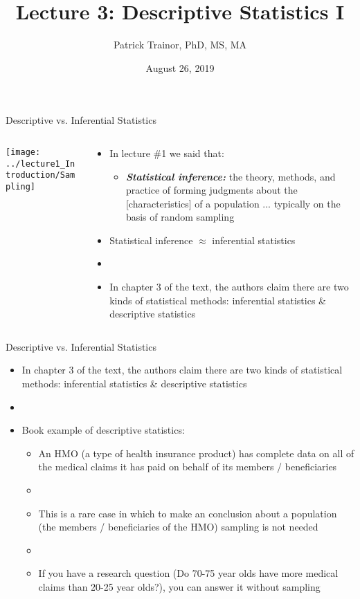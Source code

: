 \documentclass[xcolor=dvipsnames]{beamer}
\title[Lecture 1]{Lecture 3: Descriptive Statistics I}
\author[Patrick Trainor]{Patrick Trainor, PhD, MS, MA}
\institute[NMSU]{New Mexico State University}
\date{August 26, 2019}
\begin{document}
	
\begin{frame}
	\maketitle
\end{frame}

\begin{frame}{Descriptive vs. Inferential Statistics}
\begin{columns}
	\begin{column}{0.5 \textwidth}
		\texttt{[image: ../lecture1\_Introduction/Sampling]}
	\end{column}
	\begin{column}{0.5 \textwidth}
		\begin{itemize}
		\item In lecture \#1 we said that:
		\begin{itemize}
			\item \textbf{\emph{Statistical inference:}} the theory, methods, and practice of forming judgments about the [characteristics] of a population ... typically on the basis of random sampling
		\end{itemize}
		\item Statistical inference $\approx$ inferential statistics
		\item[]
		\item In chapter 3 of the text, the authors claim there are two kinds of statistical methods: inferential statistics \& descriptive statistics 
		\end{itemize}
	\end{column}
\end{columns}
\end{frame}


\begin{frame}{Descriptive vs. Inferential Statistics}
	\begin{itemize}
		\item In chapter 3 of the text, the authors claim there are two kinds of statistical methods: inferential statistics \& descriptive statistics
		\item[]
		\item Book example of descriptive statistics: 
		\begin{itemize}
			\item An HMO (a type of health insurance product) has complete data on all of the medical claims it has paid on behalf of its members / beneficiaries
			\item[]
			\item This is a rare case in which to make an conclusion about a population (the members / beneficiaries of the HMO) sampling is not needed
			\item[] 
			\item If you have a research question (Do 70-75 year olds have more medical claims than 20-25 year olds?), you can answer it without sampling
		\end{itemize}
	\end{itemize}
\end{frame}
\end{document}
